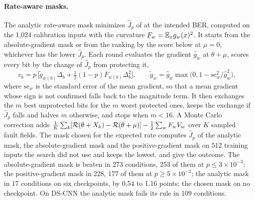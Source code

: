\paragraph{Rate-aware masks.} The analytic rate-aware mask minimizes $\hat J_p$ of  at the intended BER, computed on the 1,024 calibration inputs with the curvature $F_w=\mathbb{E}_x g_w(x)^2$. It starts from the absolute-gradient mask or from the ranking by the score below at $\mu=0$, whichever has the lower $\hat J_p$. Each round evaluates the gradient $\hat g_w$ at $\theta+\mu$, scores every bit by the change of $\hat J_p$ from protecting it,
\begin{equation*}
v_b=p\,\big[\tilde g_{w(b)}\Delta_b+\tfrac12(1-p)F_{w(b)}\Delta_b^2\big],\qquad \tilde g_w=\hat g_w\max\!\big(0,1-\mathrm{se}_w^2/\hat g_w^2\big),
\end{equation*}
where $\mathrm{se}_w$ is the standard error of the mean gradient, so that a mean gradient whose sign is not confirmed falls back to the magnitude term. It then exchanges the $m$ best unprotected bits for the $m$ worst protected ones, keeps the exchange if $\hat J_p$ falls and halves $m$ otherwise, and stops when $m<16$. A Monte Carlo correction adds $\frac1K\sum_k[\mathcal{R}(\theta+X_k)-\mathcal{R}(\theta+\mu)]-\frac12\sum_wF_wV_w$ over $K$ sampled fault fields. The mask chosen for the expected rate computes $\hat J_p$ of the analytic mask, the absolute-gradient mask and the positive-gradient mask on 512 training inputs the search did not use and keeps the lowest.  and  give the outcome. The absolute-gradient mask is beaten in 273 conditions, 253 of them at $p\le3\times10^{-3}$; the positive-gradient mask in 228, 177 of them at $p\ge5\times10^{-3}$; the analytic mask in 17 conditions on six checkpoints, by 0.54 to 1.16 points; the chosen mask on no checkpoint. On DS-CNN the analytic mask fails its rule in 109 conditions.


